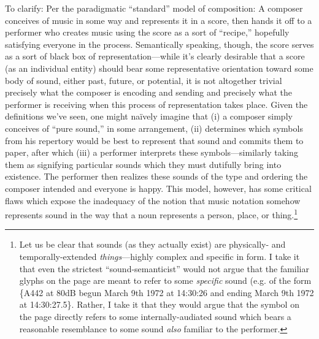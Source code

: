     To clarify: Per the paradigmatic ``standard'' model of composition: A composer conceives of music in some way and represents it in a score, then hands it off to a performer who creates music using the score as a sort of ``recipe,'' hopefully satisfying everyone in the process. Semantically speaking, though, the score serves as a sort of black box of representation---while it's clearly desirable that a score (as an individual entity) should bear some representative orientation toward some body of sound, either past, future, or potential, it is not altogether trivial precisely what the composer is encoding and sending and precisely what the performer is receiving when this process of representation takes place. Given the definitions we've seen, one might naïvely imagine that (i) a composer simply conceives of ``pure sound,'' in some arrangement, (ii) determines which symbols from his repertory would be best to represent that sound and commits them to paper, after which (iii) a performer interprets these symbols---similarly taking them as signifying particular sounds which they must dutifully bring into existence. The performer then realizes these sounds of the type and ordering the composer intended and everyone is happy. This model, however, has some critical flaws which expose the inadequacy of the notion that music notation somehow represents sound in the way that a noun represents a person, place, or thing.\footnote{
        Let us be clear that sounds (as they actually exist) are physically- and temporally-extended \textit{things}---highly complex and specific in form. I take it that even the strictest ``sound-semanticist'' would not argue that the familiar glyphs on the page are meant to refer to some \textit{specific} sound (e.g. of the form \{A442 at 80dB begun March 9th 1972 at 14:30:26 and ending March 9th 1972 at 14:30:27.5\}. Rather, I take it that they would argue that the symbol on the page directly refers to some internally-audiated sound which bears a reasonable resemblance to some sound \textit{also} familiar to the performer.
        }
    
